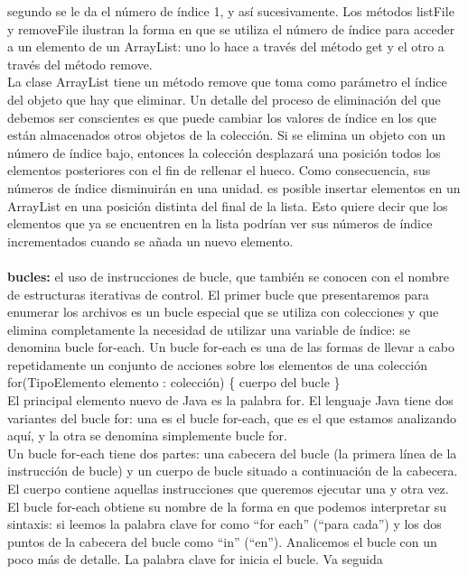 \documentclass[11pt,a4paper]{article}
\begin{document}
	segundo se le da el número de índice 1, y así sucesivamente. Los métodos listFile y removeFile ilustran la forma en que se utiliza el número de índice
	para acceder a un elemento de un ArrayList: uno lo hace a través del método get y el otro a través
	del método remove.\\
	La clase ArrayList tiene un
	método remove que toma como parámetro el índice del objeto que hay que eliminar. Un detalle
	del proceso de eliminación del que debemos ser conscientes es que puede cambiar los valores de
	índice en los que están almacenados otros objetos de la colección. Si se elimina un objeto con un
	número de índice bajo, entonces la colección desplazará una posición todos los elementos posteriores
	con el fin de rellenar el hueco. Como consecuencia, sus números de índice disminuirán en
	una unidad. es posible insertar elementos en un ArrayList en una posición
	distinta del final de la lista. Esto quiere decir que los elementos que ya se encuentren en la
	lista podrían ver sus números de índice incrementados cuando se añada un nuevo elemento.\\
	\\
	\textbf{bucles:} el uso de instrucciones de bucle, que también se
	conocen con el nombre de estructuras iterativas de control. El primer bucle que presentaremos para enumerar los archivos es un bucle especial que se utiliza
	con colecciones y que elimina completamente la necesidad de utilizar una variable de índice: se
	denomina bucle for-each. Un bucle for-each es una de las formas de llevar a cabo repetidamente un conjunto de acciones
	sobre los elementos de una colección\\
	for(TipoElemento elemento : colección) \{
		cuerpo del bucle
	\}\\
	El principal elemento nuevo de Java es la palabra for. El lenguaje Java tiene dos variantes del
	bucle for: una es el bucle for-each, que es el que estamos analizando aquí, y la otra se denomina
	simplemente bucle for.\\
	Un bucle for-each tiene dos partes: una cabecera del bucle (la primera línea de la instrucción de
	bucle) y un cuerpo de bucle situado a continuación de la cabecera. El cuerpo contiene aquellas
	instrucciones que queremos ejecutar una y otra vez. El bucle for-each obtiene su nombre de la forma en que podemos interpretar su sintaxis: si leemos
	la palabra clave for como “for each” (“para cada”) y los dos puntos de la cabecera del bucle como
	“in” (“en”). Analicemos el bucle con un poco más de detalle. La palabra clave for inicia el bucle. Va seguida
\end{document}

